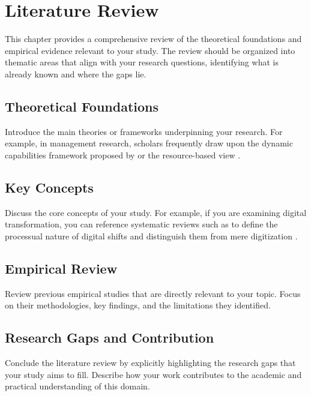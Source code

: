 
\section{Literature Review}

This chapter provides a comprehensive review of the theoretical foundations and empirical evidence relevant to your study. The review should be organized into thematic areas that align with your research questions, identifying what is already known and where the gaps lie.

\subsection{Theoretical Foundations}
Introduce the main theories or frameworks underpinning your research. For example, in management research, scholars frequently draw upon the dynamic capabilities framework proposed by \textcite{Teece2007} or the resource-based view \parencite{Barney1991}.

\subsection{Key Concepts}
Discuss the core concepts of your study. For example, if you are examining digital transformation, you can reference systematic reviews such as \textcite{Vial2019} to define the processual nature of digital shifts and distinguish them from mere digitization \parencite{Verhoef2021}.

\subsection{Empirical Review}
Review previous empirical studies that are directly relevant to your topic. Focus on their methodologies, key findings, and the limitations they identified.

\subsection{Research Gaps and Contribution}
Conclude the literature review by explicitly highlighting the research gaps that your study aims to fill. Describe how your work contributes to the academic and practical understanding of this domain.
